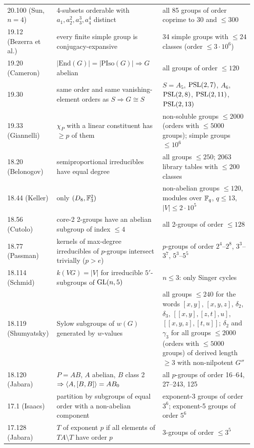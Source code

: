 \begin{longtable}{L{2.6cm}L{5.3cm}L{6.8cm}}
20.100 (Sun, $n=4$) & 4-subsets orderable with $a_1,a_2^2,a_3^3,a_4^4$ distinct & all 85 groups of order coprime to 30 and $\le 300$ \\
19.12 (Bezerra et al.) & every finite simple group is conjugacy-expansive & 34 simple groups with $\le 24$ classes (order $\le 3\cdot10^6$) \\
19.20 (Cameron) & $|\mathrm{End}(G)|=|\mathrm{PIso}(G)|\Rightarrow G$ abelian & all groups of order $\le 120$ \\
19.30 & same order and same vanishing-element orders as $S\Rightarrow G\cong S$ & $S=A_5$, $\mathrm{PSL}(2,7)$, $A_6$, $\mathrm{PSL}(2,8)$, $\mathrm{PSL}(2,11)$, $\mathrm{PSL}(2,13)$ \\
19.33 (Giannelli) & $\chi_P$ with a linear constituent has $\ge p$ of them & non-soluble groups $\le 2000$ (orders with $\le 5000$ groups); simple groups $\le 10^6$ \\
18.20 (Belonogov) & semiproportional irreducibles have equal degree & all groups $\le 250$; 2063 library tables with $\le 200$ classes \\
18.44 (Keller) & only $(D_8,\mathbb{F}_3^2)$ & non-abelian groups $\le 120$, modules over $\mathbb{F}_q$, $q\le 13$, $|V|\le 2\cdot10^5$ \\
18.56 (Cutolo) & core-2 2-groups have an abelian subgroup of index $\le 4$ & all 2-groups of order $\le 128$ \\
18.77 (Passman) & kernels of max-degree irreducibles of $p$-groups intersect trivially ($p>e$) & $p$-groups of order $2^4$--$2^8$, $3^3$--$3^7$, $5^3$--$5^5$ \\
18.114 (Schmid) & $k(VG)=|V|$ for irreducible $5'$-subgroups of $\mathrm{GL}(n,5)$ & $n\le 3$: only Singer cycles \\
18.119 (Shumyatsky) & Sylow subgroups of $w(G)$ generated by $w$-values & all groups $\le 240$ for the words $[x,y]$, $[x,y,z]$, $\delta_2$, $\delta_3$, $[[x,y],[z,t],u]$, $[[x,y,z],[t,u]]$; $\delta_2$ and $\gamma_3$ for all groups $\le 2000$ (orders with $\le 5000$ groups) of derived length $\ge 3$ with non-nilpotent $G''$ \\
18.120 (Jabara) & $P=AB$, $A$ abelian, $B$ class 2 $\Rightarrow\langle A,[B,B]\rangle=AB_0$ & all $p$-groups of order 16--64, 27--243, 125 \\
17.1 (Isaacs) & partition by subgroups of equal order with a non-abelian component & exponent-3 groups of order $3^6$; exponent-5 groups of order $5^6$ \\
17.128 (Jabara) & $T$ of exponent $p$ if all elements of $TA\setminus T$ have order $p$ & 3-groups of order $\le 3^5$ \\

\end{longtable}
